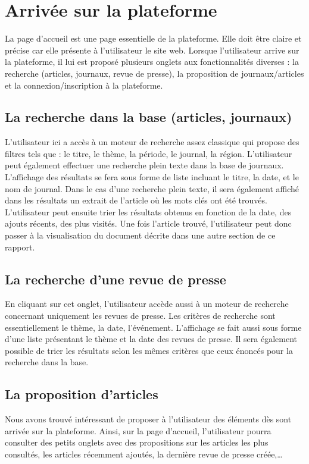 \section{Arrivée sur la plateforme}
\label{sec:arrivee}

La page d’accueil est une page essentielle de la plateforme. Elle doit être claire et précise car elle présente à l’utilisateur le site web.
Lorsque l’utilisateur arrive sur la plateforme, il lui est proposé plusieurs onglets aux fonctionnalités diverses : la recherche (articles, journaux, revue de presse), la proposition de journaux/articles et la connexion/inscription à la plateforme.

\subsection{La recherche dans la base (articles, journaux)}
\label{sec:arrivee_recherche}
L’utilisateur ici a accès à un moteur de recherche assez classique qui propose des filtres tels que : le titre, le thème, la période, le journal, la région. L’utilisateur peut également effectuer une recherche plein texte dans la base de journaux. L’affichage des résultats se fera sous forme de liste incluant le titre, la date, et le nom de journal. Dans le cas d’une recherche plein texte, il sera également affiché dans les résultats un extrait de l’article où les mots clés ont été trouvés. L’utilisateur peut ensuite trier les résultats obtenus en fonction de la date, des ajouts récents, des plus visités. Une fois l’article trouvé, l’utilisateur peut donc passer à la visualisation du document décrite dans une autre section de ce rapport.

\subsection{La recherche d’une revue de presse}
\label{sec:arrivee_revue}
En cliquant sur cet onglet, l’utilisateur accède aussi à un moteur de recherche concernant uniquement les revues de presse. Les critères de recherche sont essentiellement le thème, la date, l’événement. L’affichage se fait aussi sous forme d’une liste présentant le thème et la date des revues de presse. Il sera également possible de trier les résultats selon les mêmes critères que ceux énoncés pour la recherche dans la base.

\subsection{La proposition d’articles}
\label{sec:arrivee_article}
Nous avons trouvé intéressant de proposer à l'utilisateur des éléments dès sont arrivée sur la plateforme. Ainsi, sur la page d’accueil, l’utilisateur pourra consulter des petits onglets avec des propositions sur les articles les plus consultés, les articles récemment ajoutés, la dernière revue de presse créée,…

